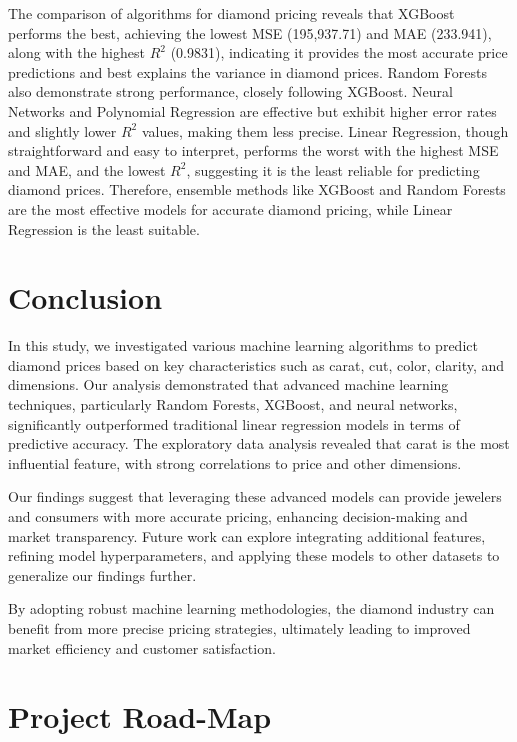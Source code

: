 \documentclass[conference]{IEEEtran}
\begin{document}
The comparison of algorithms for diamond pricing reveals that XGBoost performs the best, achieving the lowest MSE (195,937.71) and MAE (233.941), along with the highest $R^2$ (0.9831), indicating it provides the most accurate price predictions and best explains the variance in diamond prices. Random Forests also demonstrate strong performance, closely following XGBoost. Neural Networks and Polynomial Regression are effective but exhibit higher error rates and slightly lower $R^2$ values, making them less precise. Linear Regression, though straightforward and easy to interpret, performs the worst with the highest MSE and MAE, and the lowest $R^2$, suggesting it is the least reliable for predicting diamond prices. Therefore, ensemble methods like XGBoost and Random Forests are the most effective models for accurate diamond pricing, while Linear Regression is the least suitable.

\section{Conclusion}

In this study, we investigated various machine learning algorithms to predict diamond prices based on key characteristics such as carat, cut, color, clarity, and dimensions. Our analysis demonstrated that advanced machine learning techniques, particularly Random Forests, XGBoost, and neural networks, significantly outperformed traditional linear regression models in terms of predictive accuracy. The exploratory data analysis revealed that carat is the most influential feature, with strong correlations to price and other dimensions. 

Our findings suggest that leveraging these advanced models can provide jewelers and consumers with more accurate pricing, enhancing decision-making and market transparency. Future work can explore integrating additional features, refining model hyperparameters, and applying these models to other datasets to generalize our findings further.

By adopting robust machine learning methodologies, the diamond industry can benefit from more precise pricing strategies, ultimately leading to improved market efficiency and customer satisfaction.

\section{Project Road-Map}
\end{document}
